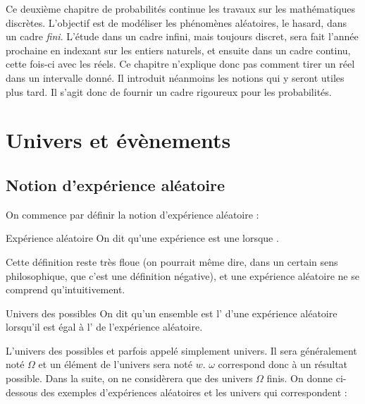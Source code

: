 \documentclass[a4paper,french,bookmarks]{article}
\begin{document}

Ce deuxième chapitre de probabilités continue les travaux sur les mathématiques discrètes. L'objectif est de modéliser les phénomènes aléatoires, le hasard, dans un cadre \textit{fini}. L'étude dans un cadre infini, mais toujours discret, sera fait l'année prochaine en indexant sur les entiers naturels, et ensuite dans un cadre continu, cette fois-ci avec les réels. Ce chapitre n'explique donc pas comment tirer  un réel dans un intervalle donné. Il introduit néanmoins les notions qui y seront utiles plus tard. Il s'agit donc de fournir un cadre rigoureux pour les probabilités.

\initcours{}

\section{Univers et évènements}

\subsection{Notion d'expérience aléatoire}

On commence par définir la notion d'expérience aléatoire :

\begin{definition}{Expérience aléatoire}{}
    On dit qu'une expérience est une  lorsque .
\end{definition}

Cette définition reste très floue (on pourrait même dire, dans un certain sens philosophique, que c'est une définition négative), et une expérience aléatoire ne se comprend qu'intuitivement.


\begin{definition}{Univers des possibles}{}
    On dit qu'un ensemble est l' d'une expérience aléatoire lorsqu'il est égal à l' de l'expérience aléatoire.
\end{definition}

L'univers des possibles et parfois appelé simplement univers. Il sera généralement noté $\Omega$ et un élément de l'univers sera noté $w$. $\omega$ correspond donc à un résultat possible. Dans la suite, on ne considèrera que des univers $\Omega$ finis. On donne ci-dessous des exemples d'expériences aléatoires et les univers qui correspondent :
\end{document}
